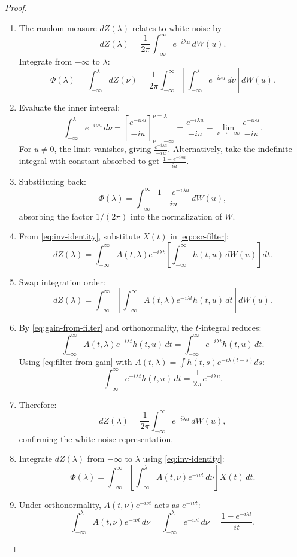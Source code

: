 \documentclass[12pt]{article}
\theoremstyle{plain}
\begin{document}
\begin{proof}
\begin{enumerate}
\item The random measure $dZ(\lambda)$ relates to white noise by
\[
dZ(\lambda) = \frac{1}{2\pi} \int_{-\infty}^\infty e^{-i\lambda u} \, dW(u).
\]
Integrate from $-\infty$ to $\lambda$:
\[
\Phi(\lambda) = \int_{-\infty}^\lambda dZ(\nu) = \frac{1}{2\pi} \int_{-\infty}^\infty \left[\int_{-\infty}^\lambda e^{-i\nu u} \, d\nu\right] dW(u).
\]
\item Evaluate the inner integral:
\[
\int_{-\infty}^\lambda e^{-i\nu u} \, d\nu = \left[\frac{e^{-i\nu u}}{-iu}\right]_{\nu=-\infty}^{\nu=\lambda} = \frac{e^{-i\lambda u}}{-iu} - \lim_{\nu \to -\infty} \frac{e^{-i\nu u}}{-iu}.
\]
For $u \neq 0$, the limit vanishes, giving $\frac{e^{-i\lambda u}}{-iu}$. Alternatively, take the indefinite integral with constant absorbed to get $\frac{1 - e^{-i\lambda u}}{iu}$.
\item Substituting back:
\[
\Phi(\lambda) = \int_{-\infty}^\infty \frac{1 - e^{-i\lambda u}}{iu} \, dW(u),
\]
absorbing the factor $1/(2\pi)$ into the normalization of $W$.
\item From \eqref{eq:inv-identity}, substitute $X(t)$ in \eqref{eq:osc-filter}:
\[
dZ(\lambda) = \int_{-\infty}^\infty A(t,\lambda) e^{-i\lambda t} \left[\int_{-\infty}^\infty h(t,u) \, dW(u)\right] dt.
\]
\item Swap integration order:
\[
dZ(\lambda) = \int_{-\infty}^\infty \left[\int_{-\infty}^\infty A(t,\lambda) e^{-i\lambda t} h(t,u) \, dt\right] dW(u).
\]
\item By \eqref{eq:gain-from-filter} and orthonormality, the $t$-integral reduces:
\[
\int_{-\infty}^\infty A(t,\lambda) e^{-i\lambda t} h(t,u) \, dt = \int_{-\infty}^\infty e^{-i\lambda t} h(t,u) \, dt.
\]
Using \eqref{eq:filter-from-gain} with $A(t,\lambda) = \int h(t,s) e^{-i\lambda(t-s)} ds$:
\[
\int_{-\infty}^\infty e^{-i\lambda t} h(t,u) \, dt = \frac{1}{2\pi} e^{-i\lambda u}.
\]
\item Therefore:
\[
dZ(\lambda) = \frac{1}{2\pi} \int_{-\infty}^\infty e^{-i\lambda u} \, dW(u),
\]
confirming the white noise representation.
\item Integrate $dZ(\lambda)$ from $-\infty$ to $\lambda$ using \eqref{eq:inv-identity}:
\[
\Phi(\lambda) = \int_{-\infty}^\infty \left[\int_{-\infty}^\lambda A(t,\nu) e^{-i\nu t} \, d\nu\right] X(t) \, dt.
\]
\item Under orthonormality, $A(t,\nu) e^{-i\nu t}$ acts as $e^{-i\nu t}$:
\[
\int_{-\infty}^\lambda A(t,\nu) e^{-i\nu t} \, d\nu = \int_{-\infty}^\lambda e^{-i\nu t} \, d\nu = \frac{1 - e^{-i\lambda t}}{it}.
\]
\end{enumerate}
\end{proof}
\end{document}
